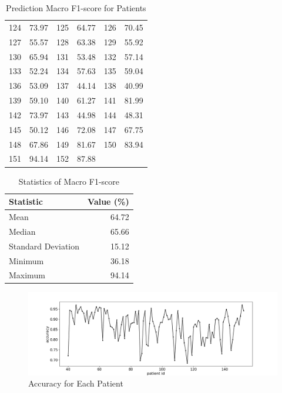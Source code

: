\documentclass{article}
\begin{document}
\begin{table}[H]
\begin{tabular*}{\textwidth}{@{\extracolsep{\fill}}cccccc}
124 & 73.97 & 125 & 64.77 & 126 & 70.45 \\
127 & 55.57 & 128 & 63.38 & 129 & 55.92 \\
130 & 65.94 & 131 & 53.48 & 132 & 57.14 \\
133 & 52.24 & 134 & 57.63 & 135 & 59.04 \\
136 & 53.09 & 137 & 44.14 & 138 & 40.99 \\
139 & 59.10 & 140 & 61.27 & 141 & 81.99 \\
142 & 73.97 & 143 & 44.98 & 144 & 48.31 \\
145 & 50.12 & 146 & 72.08 & 147 & 67.75 \\
148 & 67.86 & 149 & 81.67 & 150 & 83.94 \\
151 & 94.14 & 152 & 87.88 & & \\

\bottomrule    
\end{tabular*}
\caption{Prediction Macro F1-score for Patients}
\label{tab:accuracy}
\end{table}

\begin{table}[H]
\centering
\begin{tabular*}{\textwidth}{@{\extracolsep{\fill}}lr}
\toprule
\textbf{Statistic} & \textbf{Value (\%)} \\
\midrule
    
Mean & 64.72 \\
Median & 65.66 \\
Standard Deviation & 15.12 \\
Minimum & 36.18 \\
Maximum & 94.14 \\

\bottomrule
\end{tabular*}
\caption{Statistics of Macro F1-score}
\label{tab:stats}
\end{table}

\begin{figure}[H]
\centering
\includegraphics[width=\textwidth]{Accuracy.png}
\caption{Accuracy for Each Patient}
\label{tab:perfomance}
\end{figure}
\end{document}
